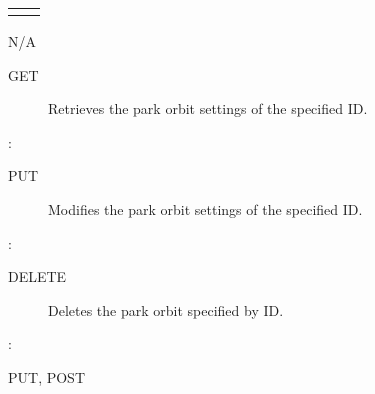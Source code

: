 \documentclass[letterpaper,10pt,english]{sphinxmanual}
\begin{document}
\begin{savenotes}\sphinxattablestart
\centering
\begin{tabulary}{\linewidth}[t]{|T|T|}
\hline

&
\\
\hline&\\
\hline
\end{tabulary}
\par
\sphinxattableend\end{savenotes}

 N/A
\begin{description}
\item[{ GET}] \leavevmode
Retrieves the park orbit settings of the specified ID.

\end{description}

:

\begin{sphinxVerbatim}[commandchars=\\\{\}]
\end{sphinxVerbatim}
\begin{description}
\item[{ PUT}] \leavevmode
Modifies the park orbit settings of the specified ID.

\end{description}

:

\begin{sphinxVerbatim}[commandchars=\\\{\}]
\end{sphinxVerbatim}
\begin{description}
\item[{ DELETE}] \leavevmode
Deletes the park orbit specified by ID.

\end{description}

:

\begin{sphinxVerbatim}[commandchars=\\\{\}]
\end{sphinxVerbatim}

 PUT, POST
\end{document}
